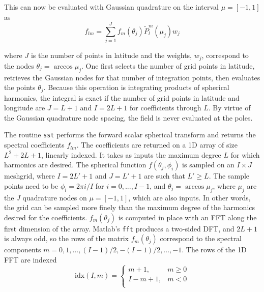 %
%

This can now be evaluated with Gaussian quadrature on the interval $\mu = [-1, 1]$ as
\begin{equation}
f_{lm} = \sum_{j=1}^J f_m(\theta_j) \widetilde{P}_l^m(\mu_j) w_j \label{forwardlegendre}
\end{equation}

\noindent where $J$ is the number of points in latitude and the weights, $w_j$, correspond to the nodes $\theta_j = \arccos\mu_j$.  One first selects the number of grid points in latitude, retrieves the Gaussian nodes for that number of integration points, then evaluates the points $\theta_j$.  Because this operation is integrating products of spherical harmonics, the integral is exact if the number of grid points in latitude and longitude are $J = L+1$ and $I = 2L+1$ for coefficients through $L$. By virtue of the Gaussian quadrature node spacing, the field is never evaluated at the poles.

The routine \texttt{sst} performs the forward scalar spherical transform and returns the spectral coefficients $f_{lm}$.  The coefficients are returned on a 1D array of size $L^2 + 2L + 1$, linearly indexed.  It takes as inputs the maximum degree $L$ for which harmonics are desired. The spherical function $f(\theta_j,\phi_i)$ is sampled on an $I \times J$ meshgrid, where $I = 2L'+1$ and $J = L'+1$ are such that $L' \ge L$.  The sample points need to be $\phi_i = 2\pi i/ I $ for $ i = 0,...,I-1$, and $\theta_j = \arccos \mu_j $, where $\mu_j$ are the $J$ quadrature nodes on $\mu = [-1, 1]$, which are also inputs. In other words, the grid can be sampled more finely than the maximum degree of the harmonics desired for the coefficients. $f_m(\theta_j)$ is computed in place with an FFT along the first dimension of the array.  Matlab's \texttt{fft} produces a two-sided DFT, and $2L+1$ is always odd, so the rows of the matrix $f_m(\theta_j)$ correspond to the spectral components $m = 0, 1, ..., (I-1)/2, -(I-1)/2, ..., -1$.  The rows of the 1D FFT are indexed 
\begin{equation}
\textrm{idx}(I,m) = \left\{ \begin{array}{cc} m + 1, & m \ge 0 \\ I - m + 1, & m < 0 \\ \end{array} \right.
\end{equation}

